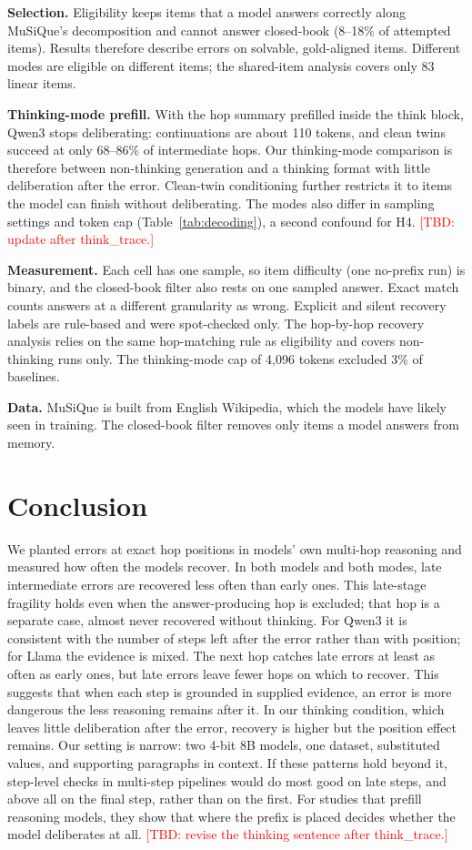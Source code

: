 \documentclass[conference]{IEEEtran}
\newcommand{\tbd}[1]{\textcolor{red}{[TBD: #1]}}
\begin{document}
\textbf{Selection.} Eligibility keeps items that a model answers correctly along MuSiQue's decomposition and cannot answer closed-book (8--18\% of attempted items). Results therefore describe errors on solvable, gold-aligned items. Different modes are eligible on different items; the shared-item analysis covers only 83 linear items.

\textbf{Thinking-mode prefill.} With the hop summary prefilled inside the think block, Qwen3 stops deliberating: continuations are about 110 tokens, and clean twins succeed at only 68--86\% of intermediate hops. Our thinking-mode comparison is therefore between non-thinking generation and a thinking format with little deliberation after the error. Clean-twin conditioning further restricts it to items the model can finish without deliberating. The modes also differ in sampling settings and token cap (Table~\ref{tab:decoding}), a second confound for H4. \tbd{update after think\_trace.}

\textbf{Measurement.} Each cell has one sample, so item difficulty (one no-prefix run) is binary, and the closed-book filter also rests on one sampled answer. Exact match counts answers at a different granularity as wrong. Explicit and silent recovery labels are rule-based and were spot-checked only. The hop-by-hop recovery analysis relies on the same hop-matching rule as eligibility and covers non-thinking runs only. The thinking-mode cap of 4{,}096 tokens excluded 3\% of baselines.

\textbf{Data.} MuSiQue is built from English Wikipedia, which the models have likely seen in training. The closed-book filter removes only items a model answers from memory.

\section{Conclusion}
We planted errors at exact hop positions in models' own multi-hop reasoning and measured how often the models recover. In both models and both modes, late intermediate errors are recovered less often than early ones. This late-stage fragility holds even when the answer-producing hop is excluded; that hop is a separate case, almost never recovered without thinking. For Qwen3 it is consistent with the number of steps left after the error rather than with position; for Llama the evidence is mixed. The next hop catches late errors at least as often as early ones, but late errors leave fewer hops on which to recover. This suggests that when each step is grounded in supplied evidence, an error is more dangerous the less reasoning remains after it. In our thinking condition, which leaves little deliberation after the error, recovery is higher but the position effect remains. Our setting is narrow: two 4-bit 8B models, one dataset, substituted values, and supporting paragraphs in context. If these patterns hold beyond it, step-level checks in multi-step pipelines would do most good on late steps, and above all on the final step, rather than on the first. For studies that prefill reasoning models, they show that where the prefix is placed decides whether the model deliberates at all. \tbd{revise the thinking sentence after think\_trace.}
\end{document}

